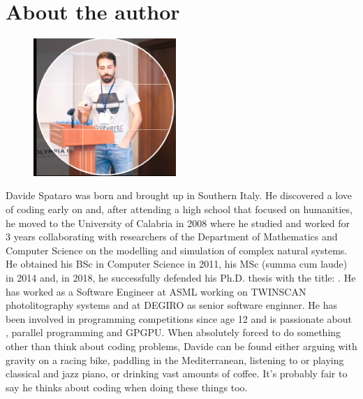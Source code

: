 \chapter*{About the author}

\begin{figure}
    \vspace{-20pt}
    \begin{center}
        \includegraphics[width=0.48\textwidth]{images/me_linkedin}
    \end{center}
    \vspace{-15pt}
  \end{figure}

Davide Spataro was born and brought up in Southern Italy. He discovered a love of coding early on and, after attending a high school that focused on humanities, he moved to the University of Calabria in 2008 where he studied and worked for 3 years collaborating with researchers of the Department of Mathematics and Computer Science on the modelling and simulation of complex natural systems. He obtained his BSc in Computer Science in 2011, his MSc (summa cum laude) in 2014 and, in 2018, he successfully defended his Ph.D. thesis with the title: . He has worked as a Software Engineer at ASML working on TWINSCAN photolitography systems and at DEGIRO as senior software enginner.
He has been involved in programming competitions since age 12 and is passionate about  \CC, parallel programming and GPGPU. When absolutely forced to do something other than think about coding problems, Davide can be found either arguing with gravity on a racing bike, paddling in the Mediterranean, listening to or playing classical and jazz piano, or drinking vast amounts of coffee. It's probably fair to say he thinks about coding when doing these things too. 

